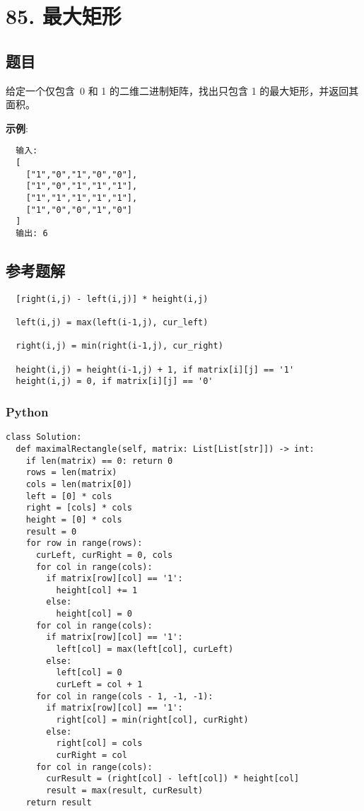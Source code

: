 \newpage
\section{85. 最大矩形}
\label{leetcode:85}

\subsection{题目}

给定一个仅包含 0 和 1 的二维二进制矩阵，找出只包含 1 的最大矩形，并返回其面积。

\textbf{示例}:

\begin{verbatim}
  输入:
  [
    ["1","0","1","0","0"],
    ["1","0","1","1","1"],
    ["1","1","1","1","1"],
    ["1","0","0","1","0"]
  ]
  输出: 6
\end{verbatim}

\subsection{参考题解}

\begin{verbatim}
  [right(i,j) - left(i,j)] * height(i,j)

  left(i,j) = max(left(i-1,j), cur_left)

  right(i,j) = min(right(i-1,j), cur_right)

  height(i,j) = height(i-1,j) + 1, if matrix[i][j] == '1'
  height(i,j) = 0, if matrix[i][j] == '0'
\end{verbatim}

\subsubsection{Python}

\begin{verbatim}
class Solution:
  def maximalRectangle(self, matrix: List[List[str]]) -> int:
    if len(matrix) == 0: return 0
    rows = len(matrix)
    cols = len(matrix[0])
    left = [0] * cols
    right = [cols] * cols
    height = [0] * cols
    result = 0
    for row in range(rows):
      curLeft, curRight = 0, cols
      for col in range(cols):
        if matrix[row][col] == '1':
          height[col] += 1
        else:
          height[col] = 0
      for col in range(cols):
        if matrix[row][col] == '1':
          left[col] = max(left[col], curLeft)
        else:
          left[col] = 0
          curLeft = col + 1
      for col in range(cols - 1, -1, -1):
        if matrix[row][col] == '1':
          right[col] = min(right[col], curRight)
        else:
          right[col] = cols
          curRight = col
      for col in range(cols):
        curResult = (right[col] - left[col]) * height[col]
        result = max(result, curResult)
    return result
\end{verbatim}

